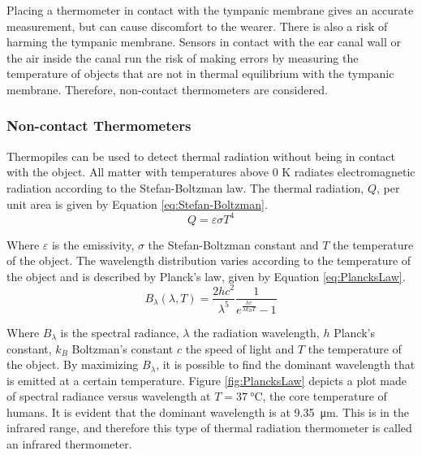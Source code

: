 \begin{description}
\medskip
Placing a thermometer in contact with the tympanic membrane gives an accurate measurement, but can cause discomfort to the wearer. There is also a risk of harming the tympanic membrane. Sensors in contact with the ear canal wall or the air inside the canal run the risk of making errors by measuring the temperature of objects that are not in thermal equilibrium with the tympanic membrane. Therefore, non-contact thermometers are considered.
\end{description}


\subsubsection{Non-contact Thermometers}
Thermopiles can be used to detect thermal radiation without being in contact with the object. All matter with temperatures above 0 K radiates electromagnetic radiation according to the Stefan-Boltzman law. The thermal radiation, $Q$, per unit area is given by Equation \ref{eq:Stefan-Boltzman}.
\begin{equation}
\label{eq:Stefan-Boltzman}
Q=\varepsilon \sigma T^4
\end{equation}

Where $\varepsilon$ is the emissivity, $\sigma$ the Stefan-Boltzman constant and $T$ the temperature of the object.
The wavelength distribution varies according to the temperature of the object and is described by Planck's law, given by Equation \ref{eq:PlancksLaw}.
\begin{equation}
\label{eq:PlancksLaw}
B_\lambda (\lambda ,T)=\frac{2hc^2}{\lambda ^5}\frac{1}{e^\frac{hc}{\lambda k_B T} -1}
\end{equation}

Where $B_\lambda$ is the spectral radiance, $\lambda$ the radiation wavelength, $h$ Planck's constant, $k_B$ Boltzman's constant $c$ the speed of light and $T$ the temperature of the object. By maximizing $B_\lambda$, it is possible to find the dominant wavelength that is emitted at a certain temperature. Figure \ref{fig:PlancksLaw} depicts a plot made of spectral radiance versus wavelength at $T=\SI{37}{\celsius}$, the core temperature of humans. It is evident that the dominant wavelength is at \SI{9.35}{\micro\meter}. This is in the infrared range, and therefore this type of thermal radiation thermometer is called an infrared thermometer.

\medskip

